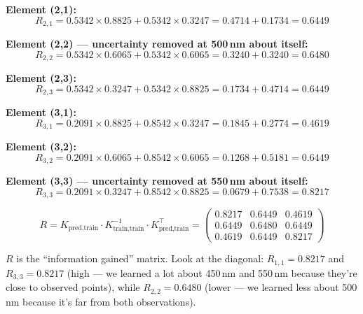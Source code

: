 \documentclass[11pt, a4paper]{article}
\newcommand{\gut}[1]{\begin{tcolorbox}[colback=lightyellow, colframe=orange!50, title=Gut feeling]#1\end{tcolorbox}}
\begin{document}
\textbf{Element (2,1):}
\begin{equation}
R_{2,1} = 0.5342 \times 0.8825 + 0.5342 \times 0.3247 = 0.4714 + 0.1734 = \mathbf{0.6449}
\tag{S6-13}
\end{equation}

\textbf{Element (2,2) --- uncertainty removed at 500\,nm about itself:}
\begin{equation}
R_{2,2} = 0.5342 \times 0.6065 + 0.5342 \times 0.6065 = 0.3240 + 0.3240 = \mathbf{0.6480}
\tag{S6-14}
\end{equation}

\textbf{Element (2,3):}
\begin{equation}
R_{2,3} = 0.5342 \times 0.3247 + 0.5342 \times 0.8825 = 0.1734 + 0.4714 = \mathbf{0.6449}
\tag{S6-15}
\end{equation}

\textbf{Element (3,1):}
\begin{equation}
R_{3,1} = 0.2091 \times 0.8825 + 0.8542 \times 0.3247 = 0.1845 + 0.2774 = \mathbf{0.4619}
\tag{S6-16}
\end{equation}

\textbf{Element (3,2):}
\begin{equation}
R_{3,2} = 0.2091 \times 0.6065 + 0.8542 \times 0.6065 = 0.1268 + 0.5181 = \mathbf{0.6449}
\tag{S6-17}
\end{equation}

\textbf{Element (3,3) --- uncertainty removed at 550\,nm about itself:}
\begin{equation}
R_{3,3} = 0.2091 \times 0.3247 + 0.8542 \times 0.8825 = 0.0679 + 0.7538 = \mathbf{0.8217}
\tag{S6-18}
\end{equation}

\begin{equation}
R = K_{\text{pred,train}} \cdot K_{\text{train,train}}^{-1} \cdot K_{\text{pred,train}}^\top =
\begin{pmatrix}
0.8217 & 0.6449 & 0.4619 \\
0.6449 & 0.6480 & 0.6449 \\
0.4619 & 0.6449 & 0.8217
\end{pmatrix}
\tag{S6-19}
\end{equation}

\gut{
$R$ is the ``information gained'' matrix. Look at the diagonal: $R_{1,1} = 0.8217$ and $R_{3,3} = 0.8217$ (high --- we learned a lot about 450\,nm and 550\,nm because they're close to observed points), while $R_{2,2} = 0.6480$ (lower --- we learned less about 500\,nm because it's far from both observations).
}
\end{document}
